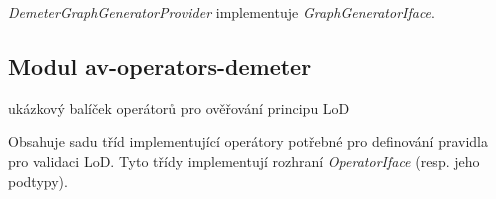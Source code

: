 
\emph{DemeterGraphGeneratorProvider} implementuje \emph{GraphGeneratorIface}.

\subsection{Modul av-operators-demeter}
ukázkový balíček operátorů pro ověřování principu LoD

Obsahuje sadu tříd implementující operátory potřebné pro definování pravidla pro validaci LoD. Tyto třídy implementují rozhraní \emph{OperatorIface} (resp. jeho podtypy).
